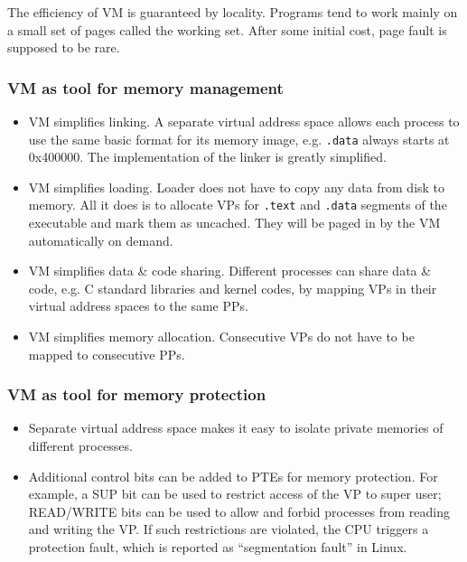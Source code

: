 The efficiency of VM is guaranteed by locality. Programs tend to work mainly on a small set of pages called the working set. After some initial cost, page fault is supposed to be rare.
\subsubsection{VM as tool for memory management}
\begin{itemize}
	\item VM simplifies linking. A separate virtual address space allows each process to use the same basic format for its memory image, e.g. \texttt{.data} always starts at 0x400000. The implementation of the linker is greatly simplified.
	\item VM simplifies loading. Loader does not have to copy any data from disk to memory. All it does is to allocate VPs for \texttt{.text} and \texttt{.data} segments of the executable and mark them as uncached. They will be paged in by the VM automatically on demand.
	\item VM simplifies data \& code sharing. Different processes can share data \& code, e.g. C standard libraries and kernel codes, by mapping VPs in their virtual address spaces to the same PPs.
	\item VM simplifies memory allocation. Consecutive VPs do not have to be mapped to consecutive PPs.
\end{itemize}
\subsubsection{VM as tool for memory protection}
\begin{itemize}
\item Separate virtual address space makes it easy to isolate private memories of different processes. 
\item Additional control bits can be added to PTEs for memory protection. For example, a SUP bit can be used to restrict access of the VP to super user; READ/WRITE bits can be used to allow and forbid processes from reading and writing the VP. If such restrictions are violated, the CPU triggers a protection fault, which is reported as ``segmentation fault'' in Linux.
\end{itemize}
